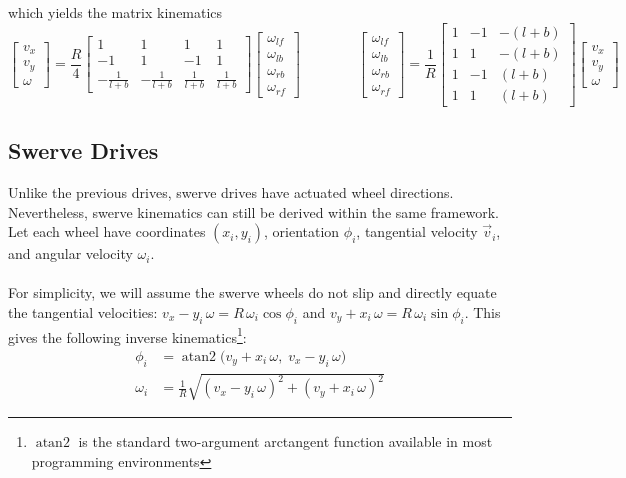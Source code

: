 \documentclass{article}
\begin{document}
which yields the matrix kinematics
\begin{equation*}
    \begin{bmatrix}
        v_x \\
        v_y \\
        \omega
    \end{bmatrix}
    =
    \frac{R}{4}
    \begin{bmatrix}
        1 & 1 & 1 & 1 \\
        -1 & 1 & -1 & 1 \\
        -\frac{1}{l+b} & -\frac{1}{l+b} & \frac{1}{l+b} & \frac{1}{l+b}
    \end{bmatrix}
    \begin{bmatrix}
        \omega_{lf} \\
        \omega_{lb} \\
        \omega_{rb} \\
        \omega_{rf}
    \end{bmatrix}
    \qquad\qquad
    \begin{bmatrix}
        \omega_{lf} \\
        \omega_{lb} \\
        \omega_{rb} \\
        \omega_{rf}
    \end{bmatrix}
    =
    \frac{1}{R}
    \begin{bmatrix}
        1 & -1 & -(l + b) \\
        1 & 1 & -(l + b) \\
        1 & -1 & (l + b) \\
        1 & 1 & (l + b)
    \end{bmatrix}
    \begin{bmatrix}
        v_x \\
        v_y \\
        \omega
    \end{bmatrix}
\end{equation*}

\subsection{Swerve Drives}
Unlike the previous drives, swerve drives have actuated wheel directions. Nevertheless, swerve kinematics can still be derived within the same framework. Let each wheel have coordinates $(x_i, y_i)$, orientation $\phi_i$, tangential velocity $\vec{v}_i$, and angular velocity $\omega_i$.\\
\\
For simplicity, we will assume the swerve wheels do not slip and directly equate the tangential velocities: $v_x - y_i \, \omega = R \, \omega_i \operatorname{cos} \phi_i$ and $v_y + x_i \, \omega = R \, \omega_i \operatorname{sin} \phi_i$. This gives the following inverse kinematics\footnote{$\operatorname{atan2}$ is the standard two-argument arctangent function available in most programming environments}:
\begin{align*}
    \phi_i &= \operatorname{atan2} \big( v_y + x_i \, \omega, \; v_x - y_i \, \omega \big)\\
    \omega_i &= \frac{1}{R} \sqrt{(v_x - y_i \, \omega)^2 + (v_y + x_i \, \omega)^2}
\end{align*}
\end{document}
